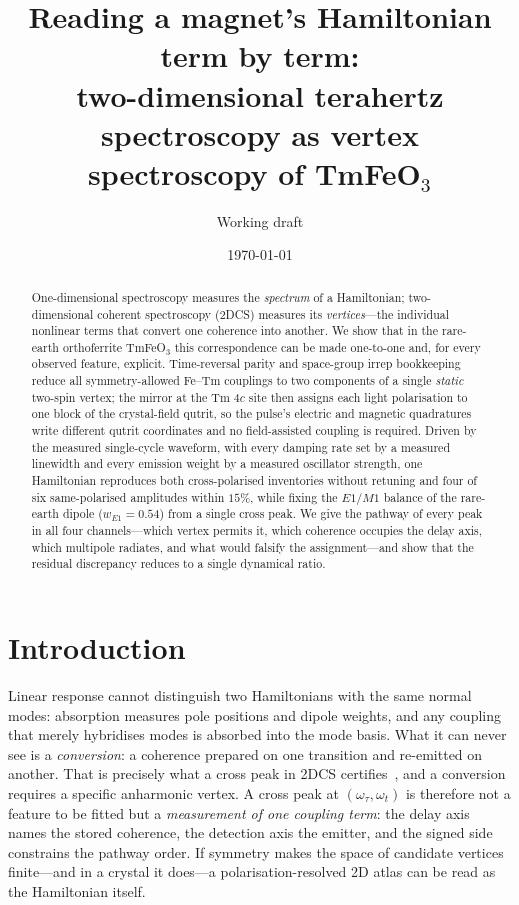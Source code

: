 \documentclass[aps,prb,twocolumn,superscriptaddress,longbibliography]{revtex4-2}
\begin{document}
\title{Reading a magnet's Hamiltonian term by term:\\
two-dimensional terahertz spectroscopy as vertex spectroscopy of
TmFeO$_3$}

\author{Working draft}
\affiliation{---}

\date{\today}

\begin{abstract}
One-dimensional spectroscopy measures the \emph{spectrum} of a
Hamiltonian; two-dimensional coherent spectroscopy (2DCS) measures its
\emph{vertices}---the individual nonlinear terms that convert one
coherence into another.  We show that in the rare-earth orthoferrite
TmFeO$_3$ this correspondence can be made one-to-one and, for every
observed feature, explicit.  Time-reversal parity and space-group irrep
bookkeeping reduce all symmetry-allowed Fe--Tm couplings to two
components of a single \emph{static} two-spin vertex; the mirror at the
Tm $4c$ site then assigns each light polarisation to one block of the
crystal-field qutrit, so the pulse's electric and magnetic quadratures
write different qutrit coordinates and no field-assisted coupling is
required.  Driven by the measured single-cycle waveform, with every
damping rate set by a measured linewidth and every emission weight by a
measured oscillator strength, one Hamiltonian reproduces both
cross-polarised inventories without retuning and four of six
same-polarised amplitudes within $15\%$, while fixing the $E1/M1$
balance of the rare-earth dipole ($w_{E1}=0.54$) from a single cross
peak.  We
give the pathway of every peak in all four channels---which vertex
permits it, which coherence occupies the delay axis, which multipole
radiates, and what would falsify the assignment---and show that the
residual discrepancy reduces to a single dynamical ratio.
\end{abstract}

\maketitle

\section{Introduction}

Linear response cannot distinguish two Hamiltonians with the same normal
modes: absorption measures pole positions and dipole weights, and any
coupling that merely hybridises modes is absorbed into the mode basis.
What it can never see is a \emph{conversion}: a coherence prepared on one
transition and re-emitted on another.  That is precisely what a cross
peak in 2DCS certifies~\cite{Lu2017,Mukamel}, and a conversion requires a
specific anharmonic vertex.  A cross peak at $(\omega_\tau,\omega_t)$ is
therefore not a feature to be fitted but a \emph{measurement of one
coupling term}: the delay axis names the stored coherence, the detection
axis the emitter, and the signed side constrains the pathway order.  If
symmetry makes the space of candidate vertices finite---and in a crystal
it does---a polarisation-resolved 2D atlas can be read as the Hamiltonian
itself.
\end{document}
